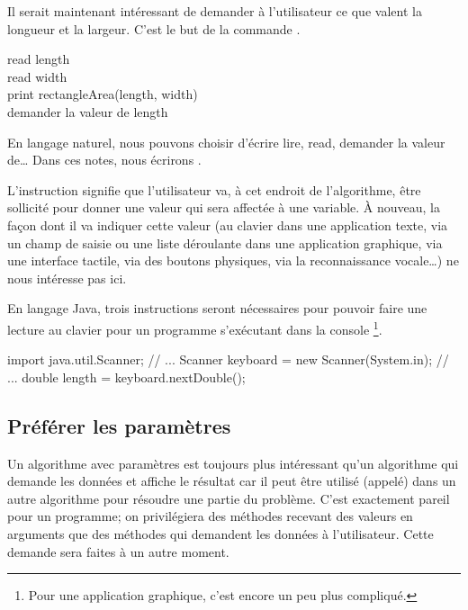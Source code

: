 			Il serait maintenant intéressant de demander à l’utilisateur ce que
			valent la longueur et la largeur.  C’est le but de la commande
			. 

			\begin{langagenaturel}
				read length \\
				read width\\
				print rectangleArea(length, width)\\

				demander la valeur de length
			\end{langagenaturel}

			En langage naturel, nous pouvons choisir d'écrire lire, read,
			demander la valeur de… Dans ces notes, nous écrirons .
	
			L’instruction  signifie que l’utilisateur va, à cet
			endroit de l’algorithme, être sollicité pour donner une valeur qui
			sera affectée à une variable.  À nouveau, la façon dont il va
			indiquer cette valeur (au clavier dans une application texte, via un
			champ de saisie ou une liste déroulante dans une application
			graphique, via une interface tactile, via des boutons physiques, via
			la reconnaissance vocale\dots) ne nous intéresse pas ici.

			En langage Java, trois instructions seront nécessaires pour 
			pouvoir faire une lecture au clavier pour un programme s'exécutant
			dans la console%
			\footnote{Pour une application graphique, c'est encore un 
			peu plus compliqué.}.

			\begin{java}
import java.util.Scanner;
// ...
Scanner keyboard = new Scanner(System.in);
// ...
double length = keyboard.nextDouble();
			\end{java}
	
		\subsection{Préférer les paramètres}
			
			Un algorithme avec paramètres est toujours plus intéressant qu’un
			algorithme qui demande les données et affiche le résultat car il
			peut être utilisé (appelé) dans un autre algorithme pour résoudre
			une partie du problème. C'est exactement pareil pour un programme;
			on privilégiera des méthodes recevant des valeurs en arguments que 
			des méthodes qui demandent les données à l'utilisateur. Cette demande
			sera faites à un autre moment. 

